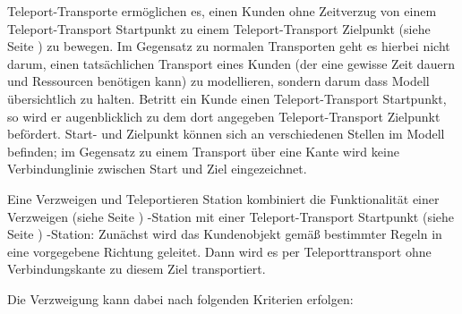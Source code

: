 Teleport-Transporte ermöglichen es, einen Kunden ohne Zeitverzug
von einem Teleport-Transport Startpunkt zu einem 
Teleport-Transport Zielpunkt (siehe Seite \pageref{ref:ModelElementTeleportDestination}) 
zu bewegen. Im Gegensatz zu normalen Transporten geht es hierbei nicht darum,
einen tatsächlichen Transport eines Kunden (der eine gewisse Zeit dauern und
Ressourcen benötigen kann) zu modellieren, sondern darum dass Modell übersichtlich
zu halten. Betritt ein Kunde einen Teleport-Transport Startpunkt, so wird er
augenblicklich zu dem dort angegeben Teleport-Transport Zielpunkt befördert.
Start- und Zielpunkt können sich an verschiedenen Stellen im Modell befinden;
im Gegensatz zu einem Transport über eine Kante wird keine Verbindunglinie
zwischen Start und Ziel eingezeichnet.

Eine Verzweigen und Teleportieren Station kombiniert die Funktionalität
einer Verzweigen (siehe Seite \pageref{ref:ModelElementDecide}) -Station mit einer
Teleport-Transport Startpunkt (siehe Seite \pageref{ref:ModelElementTeleportSource}) -Station:
Zunächst wird das Kundenobjekt gemäß bestimmter Regeln in eine vorgegebene
Richtung geleitet. Dann wird es per Teleporttransport ohne Verbindungskante
zu diesem Ziel transportiert.

Die Verzweigung kann dabei nach folgenden Kriterien erfolgen:

